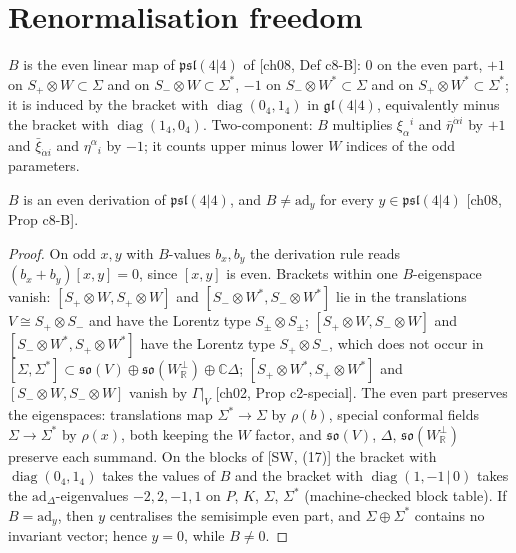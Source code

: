 \section{Renormalisation freedom}

\begin{definition}
\label{def:o-B}
$B$ is the even linear map of $\mathfrak{psl}(4|4)$ of [ch08, Def c8-B]: $0$ on the even part, $+1$ on $S_+\otimes W\subset\Sigma$ and on $S_-\otimes W\subset\Sigma^*$, $-1$ on $S_-\otimes W^*\subset\Sigma$ and on $S_+\otimes W^*\subset\Sigma^*$; it is induced by the bracket with $\operatorname{diag}(0_4,1_4)$ in $\mathfrak{gl}(4|4)$, equivalently minus the bracket with $\operatorname{diag}(1_4,0_4)$. Two-component: $B$ multiplies $\xi_\alpha{}^i$ and $\bar\eta^{\dot\alpha i}$ by $+1$ and $\bar\xi_{\dot\alpha i}$ and $\eta^\alpha{}_i$ by $-1$; it counts upper minus lower $W$ indices of the odd parameters.
\end{definition}

\begin{lemma}
\label{lem:o-Bouter}
$B$ is an even derivation of $\mathfrak{psl}(4|4)$, and $B\neq\mathrm{ad}_y$ for every $y\in\mathfrak{psl}(4|4)$ [ch08, Prop c8-B].
\end{lemma}

\begin{proof}
On odd $x,y$ with $B$-values $b_x,b_y$ the derivation rule reads $(b_x+b_y)[x,y]=0$, since $[x,y]$ is even. Brackets within one $B$-eigenspace vanish: $[S_+\otimes W,S_+\otimes W]$ and $[S_-\otimes W^*,S_-\otimes W^*]$ lie in the translations $V\cong S_+\otimes S_-$ and have the Lorentz type $S_\pm\otimes S_\pm$; $[S_+\otimes W,S_-\otimes W]$ and $[S_-\otimes W^*,S_+\otimes W^*]$ have the Lorentz type $S_+\otimes S_-$, which does not occur in $[\Sigma,\Sigma^*]\subset\mathfrak{so}(V)\oplus\mathfrak{so}(W_{\mathbb R}^\perp)\oplus\mathbb C\Delta$; $[S_+\otimes W^*,S_+\otimes W^*]$ and $[S_-\otimes W,S_-\otimes W]$ vanish by $\Gamma|_V$ [ch02, Prop c2-special]. The even part preserves the eigenspaces: translations map $\Sigma^*\to\Sigma$ by $\rho(b)$, special conformal fields $\Sigma\to\Sigma^*$ by $\rho(x)$, both keeping the $W$ factor, and $\mathfrak{so}(V)$, $\Delta$, $\mathfrak{so}(W_{\mathbb R}^\perp)$ preserve each summand. On the blocks of [SW, (17)] the bracket with $\operatorname{diag}(0_4,1_4)$ takes the values of $B$ and the bracket with $\operatorname{diag}(1,-1\,|\,0)$ takes the $\mathrm{ad}_\Delta$-eigenvalues $-2,2,-1,1$ on $P$, $K$, $\Sigma$, $\Sigma^*$ (machine-checked block table). If $B=\mathrm{ad}_y$, then $y$ centralises the semisimple even part, and $\Sigma\oplus\Sigma^*$ contains no invariant vector; hence $y=0$, while $B\neq0$.
\end{proof}

